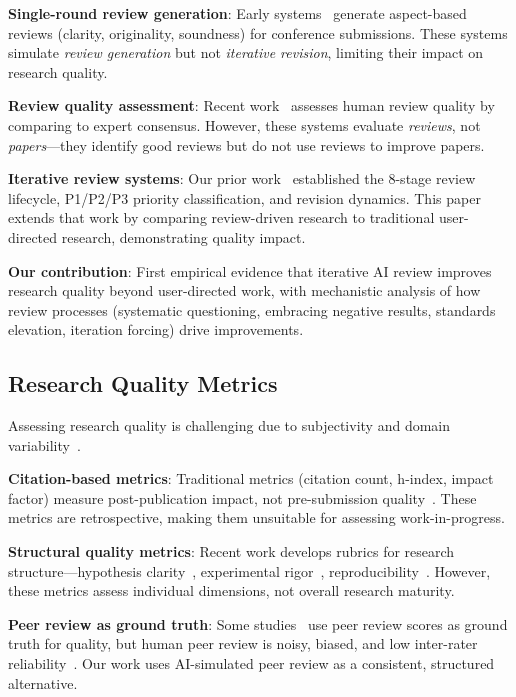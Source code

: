 \textbf{Single-round review generation}: Early systems~\cite{wang2020reviewing, chen2019neural} generate aspect-based reviews (clarity, originality, soundness) for conference submissions. These systems simulate \emph{review generation} but not \emph{iterative revision}, limiting their impact on research quality.

\textbf{Review quality assessment}: Recent work~\cite{dycke2023automated, gao2023apo} assesses human review quality by comparing to expert consensus. However, these systems evaluate \emph{reviews}, not \emph{papers}---they identify good reviews but do not use reviews to improve papers.

\textbf{Iterative review systems}: Our prior work~\cite{dellalibera2026review, dellalibera2026synthesis, dellalibera2026revision} established the 8-stage review lifecycle, P1/P2/P3 priority classification, and revision dynamics. This paper extends that work by comparing review-driven research to traditional user-directed research, demonstrating quality impact.

\textbf{Our contribution}: First empirical evidence that iterative AI review improves research quality beyond user-directed work, with mechanistic analysis of how review processes (systematic questioning, embracing negative results, standards elevation, iteration forcing) drive improvements.

\subsection{Research Quality Metrics}

Assessing research quality is challenging due to subjectivity and domain variability~\cite{aksnes2019citations}.

\textbf{Citation-based metrics}: Traditional metrics (citation count, h-index, impact factor) measure post-publication impact, not pre-submission quality~\cite{waltman2016review}. These metrics are retrospective, making them unsuitable for assessing work-in-progress.

\textbf{Structural quality metrics}: Recent work develops rubrics for research structure---hypothesis clarity~\cite{glass2021hypothesis}, experimental rigor~\cite{riley2019cochrane}, reproducibility~\cite{stodden2016enhancing}. However, these metrics assess individual dimensions, not overall research maturity.

\textbf{Peer review as ground truth}: Some studies~\cite{squazzoni2020peer, bornmann2011scientific} use peer review scores as ground truth for quality, but human peer review is noisy, biased, and low inter-rater reliability~\cite{lee2013bias, tomkins2017reviewer}. Our work uses AI-simulated peer review as a consistent, structured alternative.

